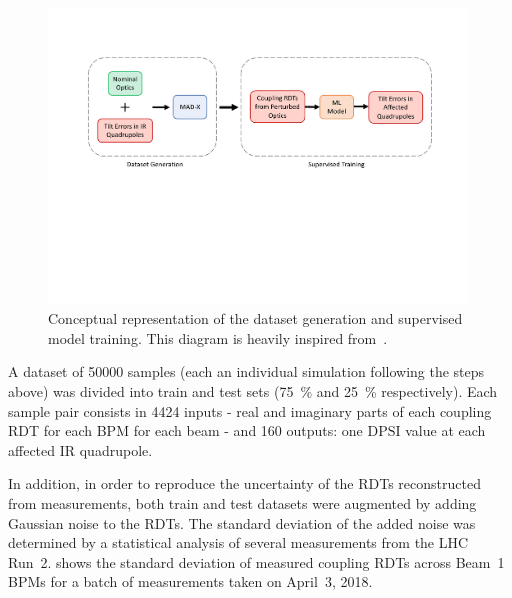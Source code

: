 \begin{figure}[!htb]
    \centering
    \includegraphics*[width=0.99\textwidth]{Figures/ML_for_IR_Coupling/supervised_training_schematic.pdf}
    \caption{Conceptual representation of the dataset generation and supervised model training. This diagram is heavily inspired from~\cite{PHD:Fol:Application_ML_Beam_Optics}.}
    \label{figure:ml_supervised_training_schematic}
\end{figure}

A dataset of \num{50000} samples (each an individual simulation following the steps above) was divided into train and test sets (\qty{75}{\percent} and \qty{25}{\percent} respectively).
Each sample pair consists in \num{4424} inputs - real and imaginary parts of each coupling RDT for each BPM for each beam - and \num{160} outputs: one \(\mathrm{DPSI}\) value at each affected IR quadrupole.

In addition, in order to reproduce the uncertainty of the RDTs reconstructed from measurements, both train and test datasets were augmented by adding Gaussian noise to the RDTs.
The standard deviation of the added noise was determined by a statistical analysis of several measurements from the LHC Run~\num{2}.
 shows the standard deviation of measured coupling RDTs across Beam~\num{1} BPMs for a batch of measurements taken on April~\num{3}, \num{2018}.

